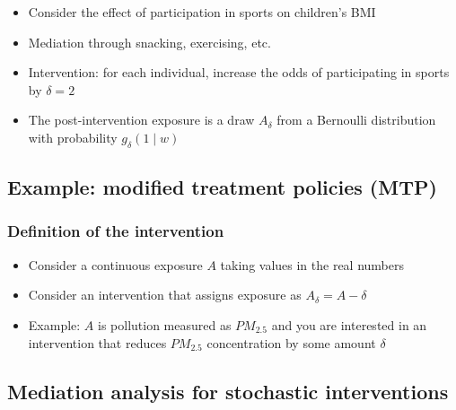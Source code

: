 \documentclass[
  12pt,
]{book}
\providecommand{\tightlist}{%
  \setlength{\itemsep}{0pt}\setlength{\parskip}{0pt}}
\theoremstyle{definition}
\theoremstyle{definition}
\theoremstyle{definition}
\newcommand{\1}{\mathbbm{1}}
\begin{document}
\begin{itemize}
\tightlist
\item
  Consider the effect of participation in sports on children's BMI
\item
  Mediation through snacking, exercising, etc.
\item
  Intervention: for each individual, increase the odds of participating in
  sports by \(\delta=2\)
\item
  The post-intervention exposure is a draw \(A_\delta\) from a Bernoulli
  distribution with probability \(g_\delta(1\mid w)\)
\end{itemize}

\hypertarget{example-modified-treatment-policies-mtp-diaz2020causal}{%
\subsection*{\texorpdfstring{Example: modified treatment policies (MTP) \citep{diaz2020causal}}{Example: modified treatment policies (MTP) {[}@diaz2020causal{]}}}\label{example-modified-treatment-policies-mtp-diaz2020causal}}


\hypertarget{definition-of-the-intervention-1}{%
\subsubsection*{Definition of the intervention}\label{definition-of-the-intervention-1}}


\begin{itemize}
\tightlist
\item
  Consider a continuous exposure \(A\) taking values in the real numbers
\item
  Consider an intervention that assigns exposure as \(A_\delta = A - \delta\)
\item
  Example: \(A\) is pollution measured as \(PM_{2.5}\) and you are interested in an
  intervention that reduces \(PM_{2.5}\) concentration by some amount \(\delta\)
\end{itemize}

\hypertarget{mediation-analysis-for-stochastic-interventions}{%
\subsection{Mediation analysis for stochastic interventions}\label{mediation-analysis-for-stochastic-interventions}}
\end{document}
